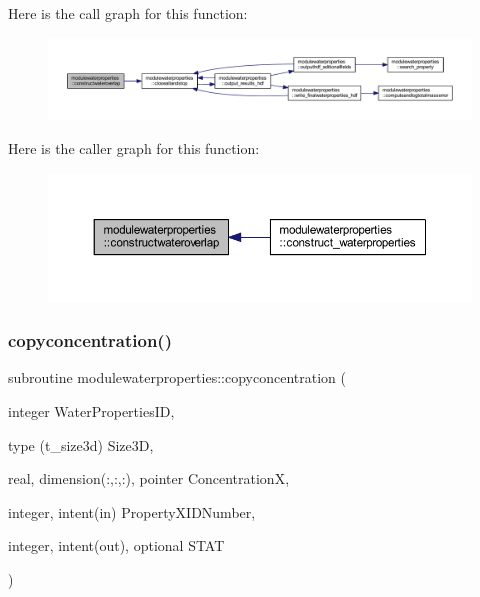 Here is the call graph for this function\+:\nopagebreak
\begin{figure}[H]
\begin{center}
\leavevmode
\includegraphics[width=350pt]{namespacemodulewaterproperties_a1c2eaa3c5cb93a51e2756820277cef75_cgraph}
\end{center}
\end{figure}
Here is the caller graph for this function\+:\nopagebreak
\begin{figure}[H]
\begin{center}
\leavevmode
\includegraphics[width=350pt]{namespacemodulewaterproperties_a1c2eaa3c5cb93a51e2756820277cef75_icgraph}
\end{center}
\end{figure}
\mbox{\label{namespacemodulewaterproperties_ab01a5978241b2f90c9951fe60f6f7f8a}} 
\subsubsection{\texorpdfstring{copyconcentration()}{copyconcentration()}}
{\footnotesize\ttfamily subroutine modulewaterproperties\+::copyconcentration (\begin{DoxyParamCaption}\item[{integer}]{Water\+Properties\+ID,  }\item[{type (t\+\_\+size3d)}]{Size3D,  }\item[{real, dimension(\+:,\+:,\+:), pointer}]{ConcentrationX,  }\item[{integer, intent(in)}]{Property\+X\+I\+D\+Number,  }\item[{integer, intent(out), optional}]{S\+T\+AT }\end{DoxyParamCaption})\hspace{0.3cm}{\ttfamily [private]}}

